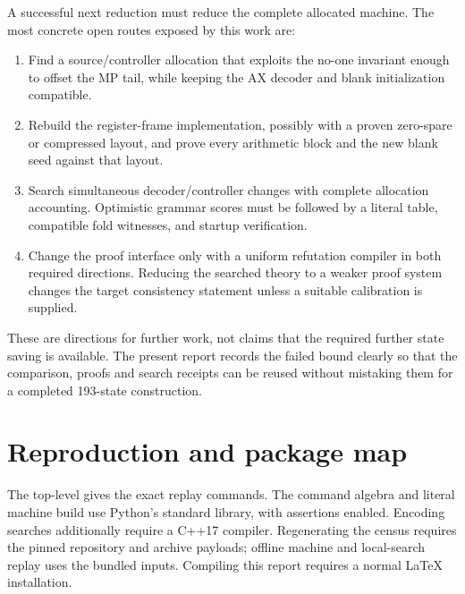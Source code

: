 \documentclass[11pt,letterpaper]{article}
\begin{document}
A successful next reduction must reduce the complete allocated machine.
The most concrete open routes exposed by this work are:
\begin{enumerate}
\item Find a source/controller allocation that exploits the no-one
invariant enough to offset the MP tail, while keeping the AX decoder and
blank initialization compatible.
\item Rebuild the register-frame implementation, possibly with a proven
zero-spare or compressed layout, and prove every arithmetic block and the
new blank seed against that layout.
\item Search simultaneous decoder/controller changes with complete
allocation accounting. Optimistic grammar scores must be followed by a
literal table, compatible fold witnesses, and startup verification.
\item Change the proof interface only with a uniform refutation compiler
in both required directions. Reducing the searched theory to a weaker
proof system changes the target consistency statement unless a suitable
calibration is supplied.
\end{enumerate}
These are directions for further work, not claims that the required further
state saving is available. The present report records the failed bound clearly
so that the comparison, proofs and search receipts can be reused without
mistaking them for a completed 193-state construction.

\section{Reproduction and package map}

The top-level  gives the exact replay commands.
The command algebra and literal machine build use Python's standard
library, with assertions enabled. Encoding searches additionally require
a C++17 compiler. Regenerating the census requires the pinned repository
and archive payloads; offline machine and local-search replay uses the
bundled inputs. Compiling this report requires a normal LaTeX installation.
\end{document}
